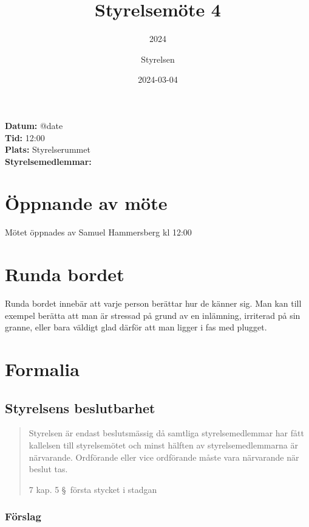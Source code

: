 \documentclass[protokoll]{dvd}
\begin{document}
\title{Styrelsemöte 4}
\subtitle{2024}
\author{Styrelsen}
\date{2024-03-04}


\textbf{Datum:} \csname @date\endcsname\\
\textbf{Tid:} 12:00\\
\textbf{Plats:} Styrelserummet\\
\textbf{Styrelsemedlemmar:}
\begin{närvarande_förtroendevalda}
\end{närvarande_förtroendevalda}

\section{Öppnande av möte}

Mötet öppnades av Samuel Hammersberg kl 12:00

\section{Runda bordet}

Runda bordet innebär att varje person berättar hur de känner sig.
Man kan till exempel berätta att man är stressad på grund av en inlämning, irriterad på sin granne, eller bara väldigt glad därför att man ligger i fas med plugget.

\section{Formalia}

\subsection{Styrelsens beslutbarhet}

\blockquote[7 kap. 5 \S~första stycket i stadgan][]{%
    Styrelsen är endast beslutsmässig då samtliga styrelsemedlemmar har fått kallelsen till styrelsemötet och minst hälften av styrelsemedlemmarna är närvarande.
    Ordförande eller vice ordförande måste vara närvarande när beslut tas.
}

\subsubsection*{Förslag}
\end{document}
